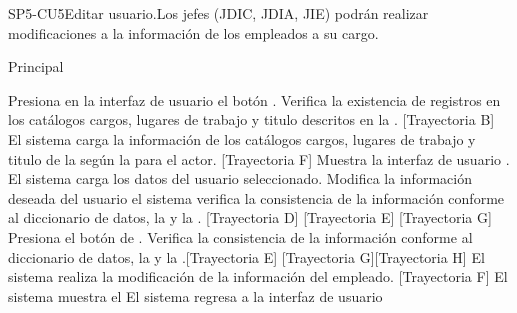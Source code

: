 \begin{UseCase}{SP5-CU5}{Editar usuario.}{Los jefes (JDIC, JDIA, JIE) podrán realizar modificaciones a la información de los empleados a su cargo.}
{\begin{itemize}
		\end{itemize}
	}
	
\end{UseCase}

\begin{UCtrayectoria}{Principal}
	
	\UCpaso[\UCactor] Presiona en la interfaz de usuario  el botón \BtnLapiz .
	\UCpaso Verifica la existencia de registros en los catálogos cargos, lugares de trabajo y titulo descritos en la . [Trayectoria B]
	\UCpaso El sistema carga la información de los catálogos cargos, lugares de trabajo y titulo de la  según la  para el actor. [Trayectoria F]
	\UCpaso Muestra la interfaz de usuario  . 
	\UCpaso El sistema carga los datos del usuario seleccionado. 
	\UCpaso[\UCactor] Modifica la información deseada del usuario el sistema verifica la consistencia de la información conforme al diccionario de datos, la   y la .  [Trayectoria D] [Trayectoria E]  [Trayectoria G] 
	\UCpaso[\UCactor]  Presiona el botón de .
	\UCpaso Verifica la consistencia de la información conforme al diccionario de datos, la  y la .[Trayectoria E] [Trayectoria G][Trayectoria H]
	\UCpaso El sistema realiza la modificación de la información del empleado. [Trayectoria F] 
	\UCpaso  El sistema muestra el   
	\UCpaso El sistema regresa a la interfaz de usuario 
\end{UCtrayectoria}

